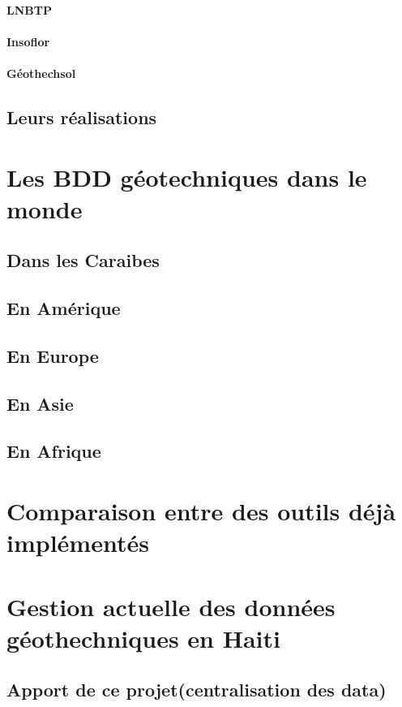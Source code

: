         \paragraph{LNBTP}
        \paragraph{Insoflor}
        \paragraph{Géothechsol}
        \subsection{Leurs réalisations}
        \lipsum[1]
        \section{Les BDD géotechniques dans le monde}
        \subsection{Dans les Caraibes}
        \lipsum[1]
        \subsection{En Amérique}
        \lipsum[1]
        \subsection{En Europe}
        \lipsum[1]
        \subsection{En Asie}
        \lipsum[1]
        \subsection{En Afrique}
        \lipsum[1]
    \section{Comparaison entre des outils déjà implémentés}
    \lipsum[1]
    \section{Gestion actuelle des données géothechniques en Haiti}
    \lipsum[1]
    \subsection{Apport de ce projet(centralisation des data)}
        \lipsum[1]
